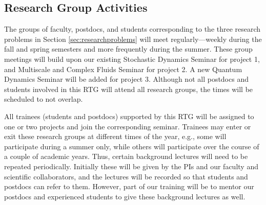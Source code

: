 \documentclass[11pt]{NSFamsart}
\begin{document}
 
 
\subsection{Research Group Activities}
The groups of faculty, postdocs, and students corresponding to the three research problems in Section \ref{sec:researchproblems} will meet regularly---weekly during the fall and spring semesters and more frequently during the summer.  These group meetings will build upon our existing Stochastic Dynamics Seminar for project 1, and Multiscale and Complex Fluids Seminar for project 2. A new Quantum Dynamics Seminar will be added for project 3.  Although not all postdocs and students involved in this RTG will attend all research groups, the times will be scheduled to not overlap. 

All trainees (students and postdocs) supported by this RTG will be assigned to one or two projects and join the corresponding seminar.  Trainees may enter or exit these research groups at different times of the year, e.g., some will participate during a summer only, while others will participate over the course of a couple of academic years. Thus, certain background lectures will need to be repeated periodically.  Initially these will be given by the PIs and our faculty and scientific collaborators, and the lectures will be recorded so that students and postdocs can refer to them.  However, part of our training will be to mentor our postdocs and experienced students to give these background lectures as well.  
\end{document}
